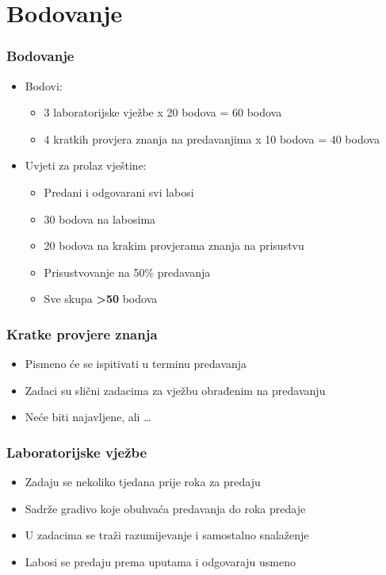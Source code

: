 \documentclass{beamer}
\begin{document}
\section{Bodovanje}
\begin{frame}[t]
\frametitle{Bodovanje}
\begin{itemize}
	\item Bodovi:
	\begin{itemize}
		\item 3 laboratorijske vježbe x 20 bodova = 60 bodova
		\item 4 kratkih provjera znanja na predavanjima x 10 bodova = 40 bodova
	\end{itemize}
	\item Uvjeti za prolaz vještine:
	\begin{itemize}
		\item Predani i odgovarani svi labosi
		\item 30 bodova na labosima
		\item 20 bodova na krakim provjerama znanja na prisustvu
		\item Prisustvovanje na 50\% predavanja
		\item Sve skupa \textbf{\textgreater 50} bodova
	\end{itemize}
\end{itemize}
\end{frame}

\begin{frame}[t]
\frametitle{Kratke provjere znanja}
\begin{itemize}
	\item Pismeno će se ispitivati u terminu predavanja
	\item Zadaci su slični zadacima za vježbu obrađenim na predavanju
	\item Neće biti najavljene, ali \ldots
\end{itemize}
\end{frame}

\begin{frame}[t]
\frametitle{Laboratorijske vježbe}
\begin{itemize}
	\item Zadaju se nekoliko tjedana prije roka za predaju
	\item Sadrže gradivo koje obuhvaća predavanja do roka predaje
	\item U zadacima se traži razumijevanje i samostalno snalaženje
	\item Labosi se predaju prema uputama i odgovaraju usmeno
\end{itemize}
\end{frame}
\end{document}
